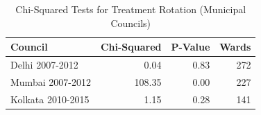 \begin{table}[!h]
\centering
\caption{\label{tab:chi_sq_cities}Chi-Squared Tests for Treatment Rotation (Municipal Councils)}
\centering
\fontsize{8}{10}\selectfont
\begin{tabular}[t]{lrrr}
\toprule
Council & Chi-Squared & P-Value & Wards\\
\midrule
Delhi 2007-2012 & 0.04 & 0.83 & 272\\
Mumbai 2007-2012 & 108.35 & 0.00 & 227\\
Kolkata 2010-2015 & 1.15 & 0.28 & 141\\
\bottomrule
\end{tabular}
\end{table}
